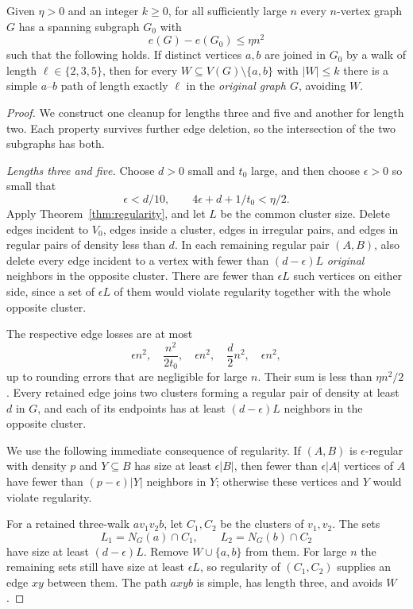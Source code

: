 \begin{lemma}\label{lem:cleanup}
Given $\eta>0$ and an integer $k\ge0$, for all sufficiently large $n$ every $n$-vertex graph $G$ has a spanning subgraph $G_0$ with
\[
 e(G)-e(G_0)\le\eta n^2
\]
such that the following holds. If distinct vertices $a,b$ are joined in $G_0$ by a walk of length $\ell\in\{2,3,5\}$, then for every $W\subseteq V(G)\setminus\{a,b\}$ with $|W|\le k$ there is a simple $a$--$b$ path of length exactly $\ell$ in the \emph{original graph $G$}, avoiding $W$.
\end{lemma}
\begin{proof}
We construct one cleanup for lengths three and five and another for length two. Each property survives further edge deletion, so the intersection of the two subgraphs has both.

\emph{Lengths three and five.}
Choose $d>0$ small and $t_0$ large, and then choose $\epsilon>0$ so small that
\[
 \epsilon<d/10,\qquad 4\epsilon+d+1/t_0<\eta/2.
\]
Apply Theorem~\ref{thm:regularity}, and let $L$ be the common cluster size. Delete edges incident to $V_0$, edges inside a cluster, edges in irregular pairs, and edges in regular pairs of density less than $d$. In each remaining regular pair $(A,B)$, also delete every edge incident to a vertex with fewer than $(d-\epsilon)L$ \emph{original} neighbors in the opposite cluster. There are fewer than $\epsilon L$ such vertices on either side, since a set of $\epsilon L$ of them would violate regularity together with the whole opposite cluster.

The respective edge losses are at most
\[
 \epsilon n^2,\quad \frac{n^2}{2t_0},\quad
 \epsilon n^2,\quad \frac d2 n^2,\quad \epsilon n^2,
\]
up to rounding errors that are negligible for large $n$. Their sum is less than $\eta n^2/2$. Every retained edge joins two clusters forming a regular pair of density at least $d$ in $G$, and each of its endpoints has at least $(d-\epsilon)L$ neighbors in the opposite cluster.

We use the following immediate consequence of regularity. If $(A,B)$ is $\epsilon$-regular with density $p$ and $Y\subseteq B$ has size at least $\epsilon|B|$, then fewer than $\epsilon|A|$ vertices of $A$ have fewer than $(p-\epsilon)|Y|$ neighbors in $Y$; otherwise these vertices and $Y$ would violate regularity.

For a retained three-walk $av_1v_2b$, let $C_1,C_2$ be the clusters of $v_1,v_2$. The sets
\[
 L_1=N_G(a)\cap C_1,\qquad L_2=N_G(b)\cap C_2
\]
have size at least $(d-\epsilon)L$. Remove $W\cup\{a,b\}$ from them. For large $n$ the remaining sets still have size at least $\epsilon L$, so regularity of $(C_1,C_2)$ supplies an edge $xy$ between them. The path $axyb$ is simple, has length three, and avoids $W$.


\end{proof}
